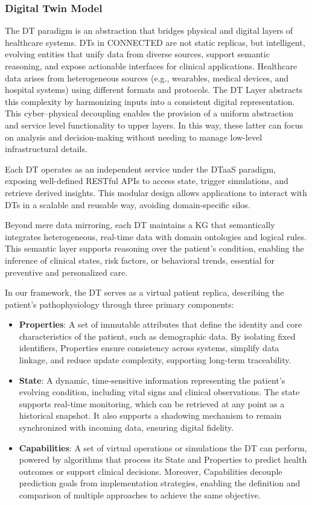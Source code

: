 \subsubsection{Digital Twin Model}
The DT paradigm is an abstraction that bridges physical and digital layers of healthcare systems. DTs in CONNECTED are not static replicas, but intelligent, evolving entities that unify data from diverse sources, support semantic reasoning, and expose actionable interfaces for clinical applications. Healthcare data arises from heterogeneous sources (e.g., wearables, medical devices, and hospital systems) using different formats and protocols. The DT Layer abstracts this complexity by harmonizing inputs into a consistent digital representation. This cyber–physical decoupling enables the provision of a uniform abstraction and service level functionality to upper layers. In this way, these latter can focus on analysis and decision-making without needing to manage low-level infrastructural details. 

Each DT operates as an independent service under the DTaaS paradigm, exposing well-defined RESTful APIs to access state, trigger simulations, and retrieve derived insights. This modular design allows applications to interact with DTs in a scalable and reusable way, avoiding domain-specific silos.

Beyond mere data mirroring, each DT maintains a KG that semantically integrates heterogeneous, real-time data with domain ontologies and logical rules. This semantic layer supports reasoning over the patient's condition, enabling the inference of clinical states, risk factors, or behavioral trends, essential for preventive and personalized care.

In our framework, the DT serves as a virtual patient replica, describing the patient’s pathophysiology through three primary components:
\begin{itemize}
    \item \textbf{Properties}: A set of immutable attributes that define the identity and core characteristics of the patient, such as demographic data. By isolating fixed identifiers, Properties ensure consistency across systems, simplify data linkage, and reduce update complexity, supporting long-term traceability.
    \item \textbf{State}: A dynamic, time-sensitive information representing the patient’s evolving condition, including vital signs and clinical observations. The state supports real-time monitoring, which can be retrieved at any point as a historical snapshot. It also supports a shadowing mechanism to remain synchronized with incoming data, ensuring digital fidelity.
    \item \textbf{Capabilities}: A set of virtual operations or simulations the DT can perform, powered by algorithms that process its State and Properties to predict health outcomes or support clinical decisions. Moreover, Capabilities decouple prediction goals from implementation strategies, enabling the definition and comparison of multiple approaches to achieve the same objective.
\end{itemize}
%
